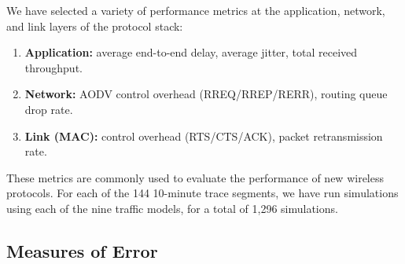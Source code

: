\documentclass[conference]{IEEEtran}
\newcommand{\caps}[1]{{\small{#1}}}
\begin{document}
We have selected a variety of performance metrics at the application, network, and link layers of the protocol stack:
\begin{enumerate}
\setlength{\itemsep}{0em}
\item \textbf{Application:} average end-to-end delay, average jitter, total received throughput.
\item \textbf{Network:} \caps{AODV} control overhead (\caps{RREQ/RREP/RERR}), routing queue drop rate.
\item \textbf{Link (\caps{MAC}):} control overhead (\caps{RTS/CTS/ACK}), packet retransmission rate.
\end{enumerate}
These metrics are commonly used to evaluate the performance of new wireless protocols. For each of the 144 10-minute trace segments, we have run simulations using each of the nine traffic models, for a total of 1,296 simulations.

\subsection{Measures of Error}\label{sec:error-measures}
\end{document}
